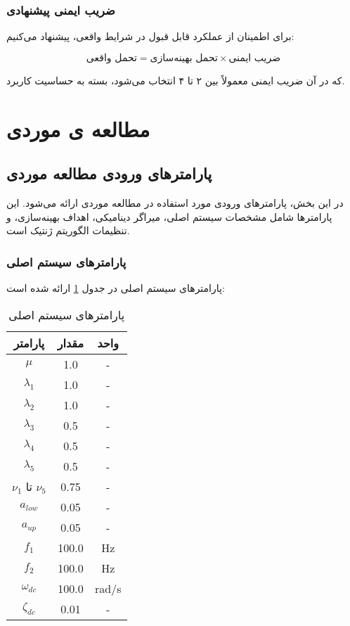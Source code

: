 \subsubsection{ضریب ایمنی پیشنهادی}

برای اطمینان از عملکرد قابل قبول در شرایط واقعی، پیشنهاد می‌کنیم:

\begin{equation}
\text{تحمل واقعی} = \text{تحمل بهینه‌سازی} \times \text{ضریب ایمنی}
\end{equation}

که در آن ضریب ایمنی معمولاً بین ۲ تا ۴ انتخاب می‌شود، بسته به حساسیت کاربرد.

\section{مطالعه ی موردی}
\subsection{پارامترهای ورودی مطالعه موردی}

در این بخش، پارامترهای ورودی مورد استفاده در مطالعه موردی ارائه می‌شود. این پارامترها شامل مشخصات سیستم اصلی، میراگر دینامیکی، اهداف بهینه‌سازی، و تنظیمات الگوریتم ژنتیک است.

\subsubsection{پارامترهای سیستم اصلی}

پارامترهای سیستم اصلی در جدول \ref{tab:main_system_params} ارائه شده است:

\begin{table}[h!]
\centering
\caption{پارامترهای سیستم اصلی}
\label{tab:main_system_params}
\begin{tabular}{|c|c|c|}
\hline
\textbf{پارامتر} & \textbf{مقدار} & \textbf{واحد} \\
\hline
$\mu$ & 1.0 & - \\
\hline
$\lambda_1$ & 1.0 & - \\
\hline
$\lambda_2$ & 1.0 & - \\
\hline
$\lambda_3$ & 0.5 & - \\
\hline
$\lambda_4$ & 0.5 & - \\
\hline
$\lambda_5$ & 0.5 & - \\
\hline
$\nu_1$ تا $\nu_5$ & 0.75 & - \\
\hline
$a_{low}$ & 0.05 & - \\
\hline
$a_{up}$ & 0.05 & - \\
\hline
$f_1$ & 100.0 & Hz \\
\hline
$f_2$ & 100.0 & Hz \\
\hline
$\omega_{dc}$ & 100.0 & rad/s \\
\hline
$\zeta_{dc}$ & 0.01 & - \\
\hline
\end{tabular}
\end{table}

